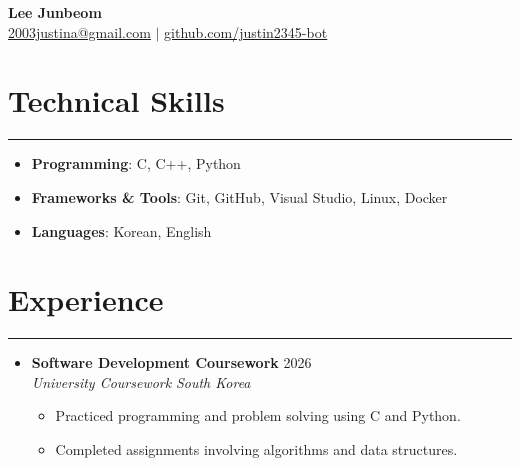 \documentclass[letterpaper,10pt]{article}
\begin{document}
\begin{center}
    \textbf{\LARGE Lee Junbeom} \\ \vspace{2pt}
    \href{mailto:yourmail@example.com}{\underline{2003justina@gmail.com}} $|$
    \href{https://github.com/yourid}{\underline{github.com/justin2345-bot}}
\end{center}

\section*{Technical Skills}
\hrule
\vspace{4pt}
\begin{itemize}
    \item[] \textbf{Programming}: C, C++, Python
    \item[] \textbf{Frameworks \& Tools}: Git, GitHub, Visual Studio, Linux, Docker
    \item[] \textbf{Languages}: Korean, English
\end{itemize}

\section*{Experience}
\hrule
\vspace{4pt}
\begin{itemize}
    \item[]
    \textbf{Software Development Coursework} \hfill 2026 \\
    \textit{University Coursework} \hfill \textit{South Korea}
    \begin{itemize}
        \item Practiced programming and problem solving using C and Python.
        \item Completed assignments involving algorithms and data structures.
    \end{itemize}
\end{itemize}

\end{document}

